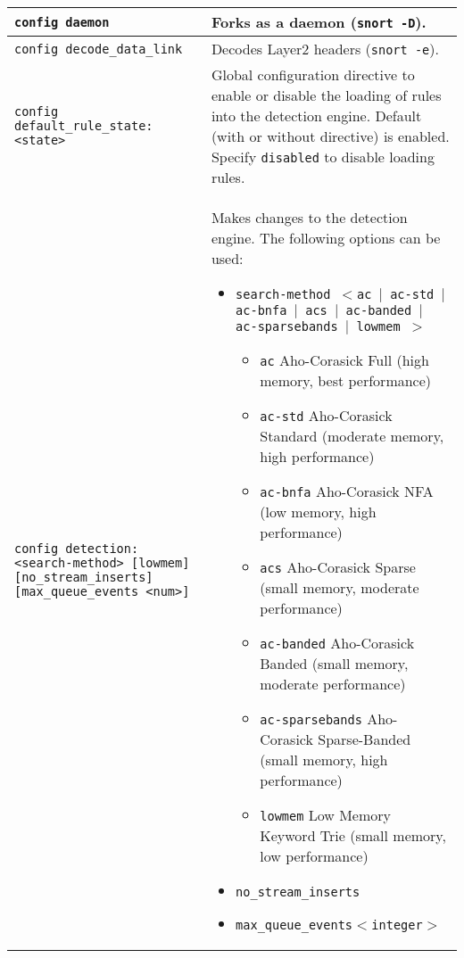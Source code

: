 \documentclass[english]{report}
\begin{document}
\begin{center}
\begin{longtable}[t]{| p{2.5in} | p{3.5in} |}
\hline
\texttt{config daemon} & Forks as a daemon (\texttt{snort -D}). \\

\hline
\texttt{config decode\_data\_link} & Decodes Layer2 headers (\texttt{snort
-e}). \\

\hline
\texttt{config default\_rule\_state: <state>} & Global configuration directive
to enable or disable the loading of rules into the detection engine.  Default
(with or without directive) is enabled.  Specify \texttt{disabled} to disable
loading rules. \\

\hline
\texttt{config detection: <search-method> [lowmem] [no\_stream\_inserts]
[max\_queue\_events <num>]} & Makes changes to the detection engine.  The following
options can be used:

\begin{itemize}
\item \texttt{search-method $<$ac $|$ ac-std
$|$ ac-bnfa $|$ acs $|$ ac-banded $|$ ac-sparsebands $|$ lowmem $>$}

\begin{itemize}

\item \texttt{ac} Aho-Corasick Full (high memory, best performance)

\item \texttt{ac-std} Aho-Corasick Standard (moderate memory, high performance)

\item \texttt{ac-bnfa} Aho-Corasick NFA (low memory, high performance)

\item \texttt{acs} Aho-Corasick Sparse (small memory, moderate performance)

\item \texttt{ac-banded} Aho-Corasick Banded (small memory, moderate
performance)

\item \texttt{ac-sparsebands} Aho-Corasick Sparse-Banded (small memory, high
performance)

\item \texttt{lowmem} Low Memory Keyword Trie (small memory, low performance)

\end{itemize}

\item \texttt{no\_stream\_inserts}

\item \texttt{max\_queue\_events$<$integer$>$}


\end{itemize}
\end{longtable}
\end{center}
\end{document}
